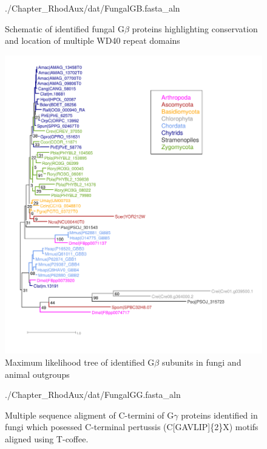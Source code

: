 \begin{figure}[hb]
  \centering
  \begin{texshade}{./Chapter_RhodAux/dat/FungalGB.fasta_aln}
    \showlegend
  \end{texshade}
  \caption[G$\beta$ WD40 repeats]{Schematic of identified fungal G$\beta$ proteins highlighting conservation and location of multiple WD40 repeat domains}
  \label{fig:ChRhodA_GbetaStruct}
\end{figure}

\begin{figure}[hb]
  \centering
  \includegraphics{./Chapter_RhodAux/img/Gbeta_tree.png}
  \caption[G$\beta$ tree]{Maximum likelihood tree of identified G$\beta$ subunits in fungi and animal outgroups}
  \label{fig:ChRhodA_GbetaTree}
\end{figure}

\begin{figure}[hb]
  \centering
  \begin{texshade}{./Chapter_RhodAux/dat/FungalGG.fasta_aln}
    \hidenumbering
  \end{texshade}
  \caption[G$\gamma$ MSA]{Multiple sequence aligment of C-termini of G$\gamma$ proteins identified in fungi which posessed C-terminal pertussis (C[GAVLIP]\{2\}X) motifs aligned using T-coffee.}
  \label{fig:ChRhodA_ggMSA}
\end{figure}

